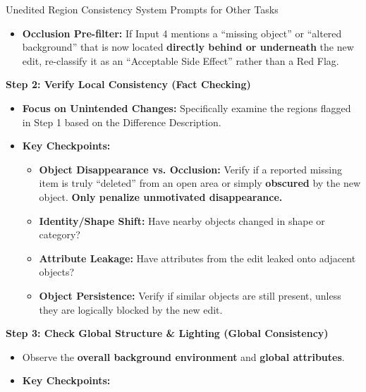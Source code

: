 \documentclass{llmxive}
\begin{document}
\begin{promptbox}[label={System Prompts: URC_Other_Tasks}]{Unedited Region Consistency System Prompts for Other Tasks}
\begin{itemize}[leftmargin=2.2em, labelsep=0.5em, itemsep=2pt]
    \item \textbf{Occlusion Pre-filter:} If Input 4 mentions a ``missing object'' or ``altered background'' that is now located \textbf{directly behind or underneath} the new edit, re-classify it as an ``Acceptable Side Effect'' rather than a Red Flag.
\end{itemize}

\medskip

\textbf{Step 2: Verify Local Consistency (Fact Checking)}

\begin{itemize}[leftmargin=2.2em, labelsep=0.5em, itemsep=2pt]
    \item \textbf{Focus on Unintended Changes:} Specifically examine the regions flagged in Step 1 based on the Difference Description.
    
    \item \textbf{Key Checkpoints:}
    
    \begin{itemize}[leftmargin=2.2em, labelsep=0.5em, itemsep=2pt]
        \item \textbf{Object Disappearance vs. Occlusion:} Verify if a reported missing item is truly ``deleted'' from an open area or simply \textbf{obscured} by the new object. \textbf{Only penalize unmotivated disappearance.}
        
        \item \textbf{Identity/Shape Shift:} Have nearby objects changed in shape or category?
        
        \item \textbf{Attribute Leakage:} Have attributes from the edit leaked onto adjacent objects?
        
        \item \textbf{Object Persistence:} Verify if similar objects are still present, unless they are logically blocked by the new edit.
    \end{itemize}
\end{itemize}

\medskip

\textbf{Step 3: Check Global Structure \& Lighting (Global Consistency)}

\begin{itemize}[leftmargin=2.2em, labelsep=0.5em, itemsep=2pt]
    \item Observe the \textbf{overall background environment} and \textbf{global attributes}.
    
    \item \textbf{Key Checkpoints:}
    

\end{itemize}
\end{promptbox}
\end{document}
